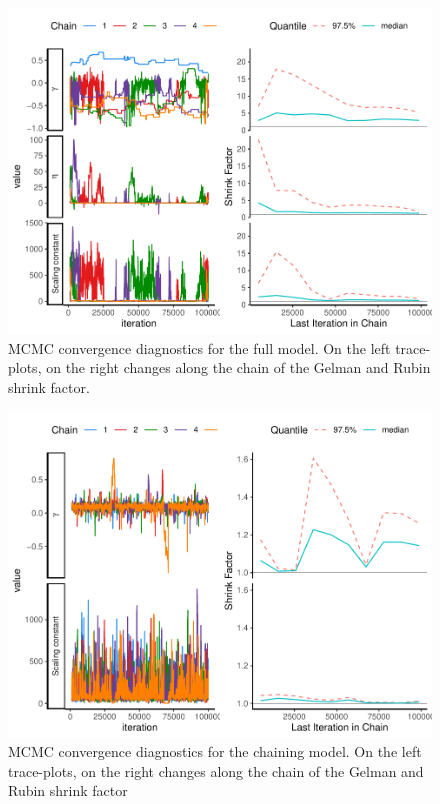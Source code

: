 \documentclass[
  12pt,
]{article}
\begin{document}
\begin{figure}
\includegraphics[width=1\linewidth]{manuscript_BE_files/figure-latex/diagnosticsfullPAA-1} \caption{MCMC convergence diagnostics for the full model. On the left trace-plots, on the right changes along the chain of the Gelman and Rubin shrink factor.}\label{fig:diagnosticsfullPAA}
\end{figure}

\begin{figure}
\includegraphics[width=1\linewidth]{manuscript_BE_files/figure-latex/diaggamPAA-1} \caption{MCMC convergence diagnostics for the chaining model. On the left trace-plots, on the right changes along the chain of the Gelman and Rubin shrink factor }\label{fig:diaggamPAA}
\end{figure}
\end{document}
